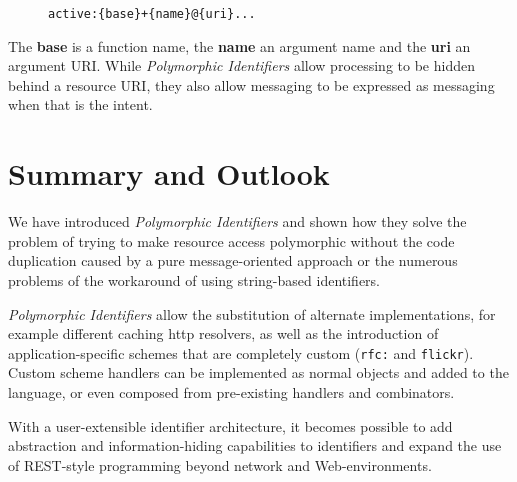 \documentclass[preprint,authoryear]{llncs}
\begin{document}
\begin{figure}[htbp]
\begin{lstlisting}[style=L,label= activeuri,caption=Active URI.]
  active:{base}+{name}@{uri}...
\end{lstlisting}
\end{figure}

The {\bf base} is a function name, the {\bf name} an argument name and the
{\bf uri} an argument URI.
 While \emph{Polymorphic Identifiers} allow processing to be
hidden behind a resource URI, they also allow messaging to be expressed
as messaging when that is the intent.


\section{Summary and Outlook}
\label{summary-and-outlook}

We have introduced \emph{Polymorphic Identifiers} and shown how they
solve the problem of trying to make resource access polymorphic without
the code duplication caused by a pure message-oriented approach or the
numerous problems of the workaround of using string-based identifiers.

\emph{Polymorphic Identifiers} allow the substitution of alternate implementations,
for example different caching http resolvers, as well as the introduction of 
application-specific schemes that are completely custom ({\tt rfc:} and {\tt flickr}).
Custom scheme handlers can be implemented as normal objects and added
to the language, or even composed from pre-existing handlers and
combinators.

With a user-extensible identifier architecture, it becomes possible to add abstraction
and information-hiding capabilities to identifiers and expand the use of REST-style
programming beyond network and Web-environments.







\vfill
\break





\end{document}
